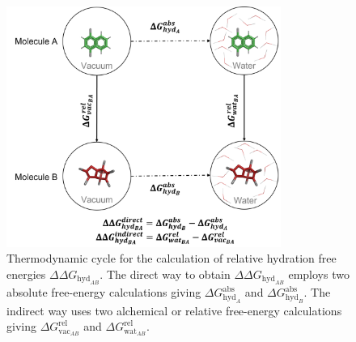 \begin{figure}[h!]
    \centering
    \includegraphics[width=0.8\textwidth]{fig/theory/ThermCycle.png}
    \caption{Thermodynamic cycle for the calculation of relative hydration free energies $\Delta \Delta G_{\text{hyd}_{AB}}$. The direct way to obtain $\Delta \Delta G_{\text{hyd}_{AB}}$ employs two absolute free-energy calculations giving $\Delta G^\text{abs}_{\text{hyd}_A}$ and $\Delta G^\text{abs}_{\text{hyd}_B}$. The indirect way uses two alchemical or relative free-energy calculations giving $\Delta G^\text{rel}_{\text{vac}_{AB}}$ and $\Delta G^\text{rel}_{\text{wat}_{AB}}$.
    }
    \label{fig:thermodynamic_cycle}
\end{figure}

